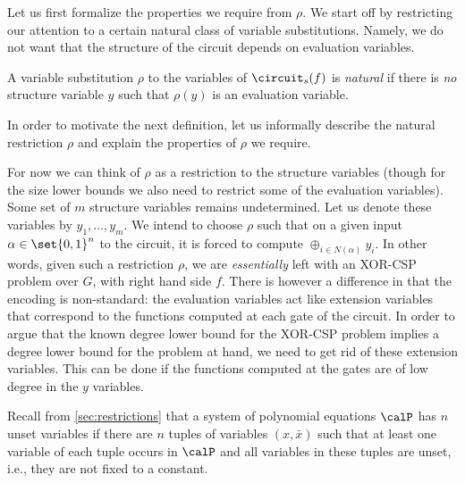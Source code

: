 Let us first formalize the properties we require from $\rho$. We start
off by restricting our attention to a certain natural class of variable
substitutions. Namely, we do not want that the structure of the circuit
depends on evaluation variables.

\begin{definition}
  A variable substitution $\rho$ to the variables of $\circuit_s(f)$ is
  \emph{natural} if there is \emph{no} structure variable $y$ such
  that $\rho(y)$ is an evaluation variable.
\end{definition}

In order to motivate the next definition, let us informally
describe the natural restriction $\rho$ and explain the properties of
$\rho$ we require.

For now we can think of $\rho$ as a restriction to the structure
variables (though for the size lower bounds we also need to restrict
some of the evaluation variables). Some set of $m$ structure variables remains
undetermined. Let us denote these variables by $y_1, \ldots, y_m$. We
intend to choose $\rho$ such that on a given input
$\alpha \in \set{0,1}^n$ to the circuit, it is forced to compute
$\oplus_{i \in N(\alpha)} y_i$.  In other words, given such a
restriction $\rho$, we are \emph{essentially} left with an XOR-CSP
problem over $G$, with right hand side $f$.  There is however a
difference in that the encoding is non-standard: the evaluation
variables act like extension variables that correspond to the
functions computed at each gate of the circuit. In order to argue that
the known degree lower bound for the XOR-CSP problem implies a degree
lower bound for the problem at hand, we need to get rid of these
extension variables. This can be done if the functions computed at the
gates are of low degree in the $y$ variables.

Recall from \cref{sec:restrictions} that a system of polynomial
equations $\calP$ has $n$ unset variables if there are $n$ tuples of
variables $(x, \bar x)$ such that at least one variable of each tuple
occurs in $\calP$ and all variables in these tuples are unset, i.e.,
they are not fixed to a constant.

